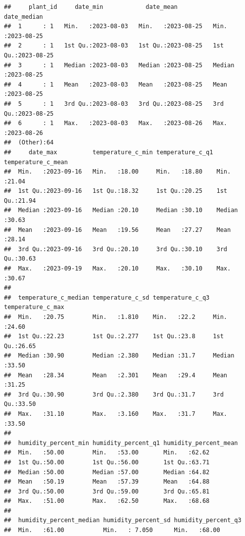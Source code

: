 \documentclass[
]{article}
\begin{document}
\begin{verbatim}
##     plant_id     date_min            date_mean           date_median        
##  1      : 1   Min.   :2023-08-03   Min.   :2023-08-25   Min.   :2023-08-25  
##  2      : 1   1st Qu.:2023-08-03   1st Qu.:2023-08-25   1st Qu.:2023-08-25  
##  3      : 1   Median :2023-08-03   Median :2023-08-25   Median :2023-08-25  
##  4      : 1   Mean   :2023-08-03   Mean   :2023-08-25   Mean   :2023-08-25  
##  5      : 1   3rd Qu.:2023-08-03   3rd Qu.:2023-08-25   3rd Qu.:2023-08-25  
##  6      : 1   Max.   :2023-08-03   Max.   :2023-08-26   Max.   :2023-08-26  
##  (Other):64                                                                 
##     date_max          temperature_c_min temperature_c_q1 temperature_c_mean
##  Min.   :2023-09-16   Min.   :18.00     Min.   :18.80    Min.   :21.04     
##  1st Qu.:2023-09-16   1st Qu.:18.32     1st Qu.:20.25    1st Qu.:21.94     
##  Median :2023-09-16   Median :20.10     Median :30.10    Median :30.63     
##  Mean   :2023-09-16   Mean   :19.56     Mean   :27.27    Mean   :28.14     
##  3rd Qu.:2023-09-16   3rd Qu.:20.10     3rd Qu.:30.10    3rd Qu.:30.63     
##  Max.   :2023-09-19   Max.   :20.10     Max.   :30.10    Max.   :30.67     
##                                                                            
##  temperature_c_median temperature_c_sd temperature_c_q3 temperature_c_max
##  Min.   :20.75        Min.   :1.810    Min.   :22.2     Min.   :24.60    
##  1st Qu.:22.23        1st Qu.:2.277    1st Qu.:23.8     1st Qu.:26.65    
##  Median :30.90        Median :2.380    Median :31.7     Median :33.50    
##  Mean   :28.34        Mean   :2.301    Mean   :29.4     Mean   :31.25    
##  3rd Qu.:30.90        3rd Qu.:2.380    3rd Qu.:31.7     3rd Qu.:33.50    
##  Max.   :31.10        Max.   :3.160    Max.   :31.7     Max.   :33.50    
##                                                                          
##  humidity_percent_min humidity_percent_q1 humidity_percent_mean
##  Min.   :50.00        Min.   :53.00       Min.   :62.62        
##  1st Qu.:50.00        1st Qu.:56.00       1st Qu.:63.71        
##  Median :50.00        Median :57.00       Median :64.82        
##  Mean   :50.19        Mean   :57.39       Mean   :64.88        
##  3rd Qu.:50.00        3rd Qu.:59.00       3rd Qu.:65.81        
##  Max.   :51.00        Max.   :62.50       Max.   :68.68        
##                                                                
##  humidity_percent_median humidity_percent_sd humidity_percent_q3
##  Min.   :61.00           Min.   : 7.050      Min.   :68.00      

\end{verbatim}
\end{document}
